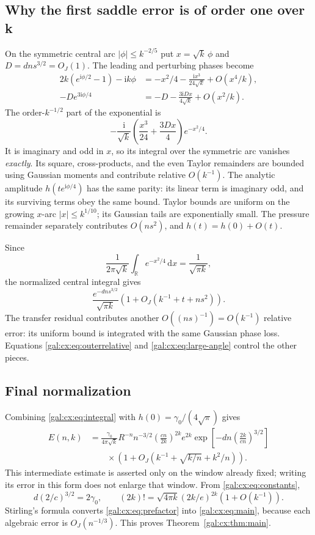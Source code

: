 \documentclass[11pt,letterpaper]{article}
\numberwithin{equation}{section}
\theoremstyle{definition}\newtheorem{definition}[theorem]{Definition}
\theoremstyle{remark}\newtheorem{remark}[theorem]{Remark}
\newcommand{\ii}{\mathrm i}
\newcommand{\dd}{\mathrm d}
\begin{document}
\subsection{Why the first saddle error is of order one over k}
On the symmetric central arc $|\phi|\le k^{-2/5}$ put $x=\sqrt k\,\phi$ and $D=dns^{3/2}=O_J(1)$. The leading and perturbing phases become
\begin{align}
2k(e^{\ii\phi/2}-1)-\ii k\phi
&=-x^2/4-\frac{\ii x^3}{24\sqrt k}+O(x^4/k),\label{gal:cx:eq:lead-expand}\\
-De^{3\ii\phi/4}
&=-D-\frac{3\ii Dx}{4\sqrt k}+O(x^2/k).\label{gal:cx:eq:pert-expand}
\end{align}
The order-$k^{-1/2}$ part of the exponential is
\[
-\frac{\ii}{\sqrt k}\left(\frac{x^3}{24}+\frac{3Dx}{4}\right)e^{-x^2/4}.
\]
It is imaginary and odd in $x$, so its integral over the symmetric arc vanishes \emph{exactly}. Its square, cross-products, and the even Taylor remainders are bounded using Gaussian moments and contribute relative $O(k^{-1})$. The analytic amplitude $h(te^{\ii\phi/4})$ has the same parity: its linear term is imaginary odd, and its surviving terms obey the same bound. Taylor bounds are uniform on the growing $x$-arc $|x|\le k^{1/10}$; its Gaussian tails are exponentially small. The pressure remainder separately contributes $O(ns^2)$, and $h(t)=h(0)+O(t)$.

Since
\[
\frac{1}{2\pi\sqrt k}\int_{\mathbb R}e^{-x^2/4}\,\dd x
=\frac{1}{\sqrt{\pi k}},
\]
the normalized central integral gives
\begin{equation}\label{gal:cx:eq:integral}
\frac{e^{-dns^{3/2}}}{\sqrt{\pi k}}
\left(1+O_J(k^{-1}+t+ns^2)\right).
\end{equation}
The transfer residual contributes another $O((ns)^{-1})=O(k^{-1})$ relative error: its uniform bound is integrated with the same Gaussian phase loss. Equations \eqref{gal:cx:eq:outerrelative} and \eqref{gal:cx:eq:large-angle} control the other pieces.

\subsection{Final normalization}
Combining \eqref{gal:cx:eq:integral} with $h(0)=\gamma_0/(4\sqrt\pi)$ gives
\begin{equation}\label{gal:cx:eq:prefactor}
\begin{aligned}
E(n,k)&=\frac{\gamma_0}{4\pi\sqrt k}R^{-n}n^{-3/2}
\left(\frac{cn}{2k}\right)^{2k}e^{2k}
\exp\!\left[-dn\left(\frac{2k}{cn}\right)^{3/2}\right]\\
&\qquad\times\left(1+O_J\!\left(k^{-1}+\sqrt{k/n}+k^2/n\right)\right).
\end{aligned}
\end{equation}
This intermediate estimate is asserted only on the window already fixed; writing its error in this form does not enlarge that window. From \eqref{gal:cx:eq:constants},
\[
d(2/c)^{3/2}=2\gamma_0,
\qquad (2k)!=\sqrt{4\pi k}(2k/e)^{2k}(1+O(k^{-1})).
\]
Stirling's formula converts \eqref{gal:cx:eq:prefactor} into \eqref{gal:cx:eq:main}, because each algebraic error is $O_J(n^{-1/3})$. This proves Theorem~\ref{gal:cx:thm:main}.
\end{document}
